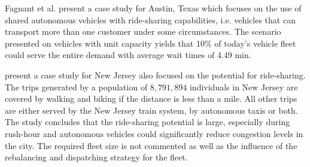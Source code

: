 
Fagnant et al. \cite{fagnant2015dynamic} present a case study for Austin, Texas which focuses on the use of shared autonomous vehicles with ride-sharing capabilities, i.e. vehicles that can transport more than one customer under some circumstances. The scenario presented on vehicles with unit capacity yields that 10\% of today's vehicle fleet could serve the entire demand with average wait times of 4.49 min. 

\cite{zachariah2014uncongested} present a case study for New Jersey also focused on the potential for ride-sharing. The trips generated by a population of $8,791,894$ individuals in New Jersey are covered by walking and biking if the distance is less than a mile. All other trips are either served by the New Jersey train system, by autonomous taxis or both. The study concludes that the ride-sharing potential is large, especially during rush-hour and autonomous vehicles could significantly reduce congestion levels in the city. The required fleet size is not commented as well as the influence of the rebalancing and dispatching strategy for the fleet.

